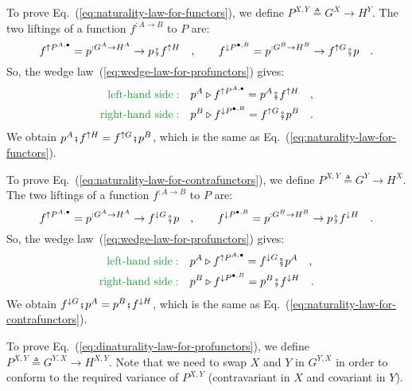 To prove Eq.~(\ref{eq:naturality-law-for-functors}), we define $P^{X,Y}\triangleq G^{X}\rightarrow H^{Y}$.
The two liftings of a function $f^{:A\rightarrow B}$ to $P$ are:
\[
f^{\uparrow P^{A,\bullet}}=p^{:G^{A}\rightarrow H^{A}}\rightarrow p\bef f^{\uparrow H}\quad,\quad\quad f^{\downarrow P^{\bullet,B}}=p^{:G^{B}\rightarrow H^{B}}\rightarrow f^{\uparrow G}\bef p\quad.
\]
So, the wedge law~(\ref{eq:wedge-law-for-profunctors}) gives:
\begin{align*}
{\color{greenunder}\text{left-hand side}:}\quad & p^{A}\triangleright f^{\uparrow P^{A,\bullet}}=p^{A}\bef f^{\uparrow H}\quad,\\
{\color{greenunder}\text{right-hand side}:}\quad & p^{B}\triangleright f^{\downarrow P^{\bullet,B}}=f^{\uparrow G}\bef p^{B}\quad.
\end{align*}
We obtain $p^{A}\bef f^{\uparrow H}=f^{\uparrow G}\bef p^{B}$, which
is the same as Eq.~(\ref{eq:naturality-law-for-functors}).

To prove Eq.~(\ref{eq:naturality-law-for-contrafunctors}), we define
$P^{X,Y}\triangleq G^{Y}\rightarrow H^{X}$. The two liftings of a
function $f^{:A\rightarrow B}$ to $P$ are:
\[
f^{\uparrow P^{A,\bullet}}=p^{:G^{A}\rightarrow H^{A}}\rightarrow f^{\downarrow G}\bef p\quad,\quad\quad f^{\downarrow P^{\bullet,B}}=p^{:G^{B}\rightarrow H^{B}}\rightarrow p\bef f^{\downarrow H}\quad.
\]
So, the wedge law~(\ref{eq:wedge-law-for-profunctors}) gives:
\begin{align*}
{\color{greenunder}\text{left-hand side}:}\quad & p^{A}\triangleright f^{\uparrow P^{A,\bullet}}=f^{\downarrow G}\bef p^{A}\quad,\\
{\color{greenunder}\text{right-hand side}:}\quad & p^{B}\triangleright f^{\downarrow P^{\bullet,B}}=p^{B}\bef f^{\downarrow H}\quad.
\end{align*}
We obtain $f^{\downarrow G}\bef p^{A}=p^{B}\bef f^{\downarrow H}$,
which is the same as Eq.~(\ref{eq:naturality-law-for-contrafunctors}).

To prove Eq.~(\ref{eq:dinaturality-law-for-profunctors}), we define
$P^{X,Y}\triangleq G^{Y,X}\rightarrow H^{X,Y}$. Note that we need
to swap $X$ and $Y$ in $G^{Y,X}$ in order to conform to the required
variance of $P^{X,Y}$ (contravariant in $X$ and covariant in $Y$). 

